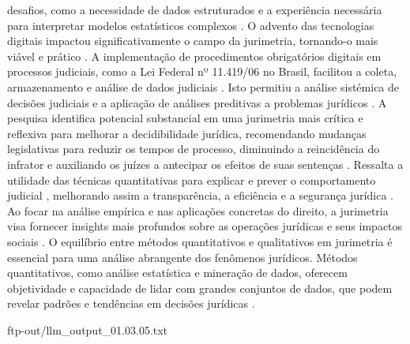 desafios, como a necessidade de dados estruturados e a experiência necessária para interpretar modelos estatísticos complexos \cite{103390fi9040068, l2010de}. O advento das tecnologias digitais impactou significativamente o campo da jurimetria, tornando-o mais viável e prático \cite{silva2023role, 103390fi9040068}. A implementação de procedimentos obrigatórios digitais em processos judiciais, como a Lei Federal nº 11.419/06 no Brasil, facilitou a coleta, armazenamento e análise de dados judiciais \cite{103390fi9040068}. Isto permitiu a análise sistémica de decisões judiciais e a aplicação de análises preditivas a problemas jurídicos \cite{silva2023role, 103390fi9040068}. A pesquisa identifica potencial substancial em uma jurimetria mais crítica e reflexiva para melhorar a decidibilidade jurídica, recomendando mudanças legislativas para reduzir os tempos de processo, diminuindo a reincidência do infrator e auxiliando os juízes a antecipar os efeitos de suas sentenças \cite{nunes2018}. Ressalta a utilidade das técnicas quantitativas para explicar e prever o comportamento judicial \cite{luvizotto2020}, melhorando assim a transparência, a eficiência e a segurança jurídica \cite{silva2023}. Ao focar na análise empírica e nas aplicações concretas do direito, a jurimetria visa fornecer insights mais profundos sobre as operações jurídicas e seus impactos sociais \cite{nunes2018}. O equilíbrio entre métodos quantitativos e qualitativos em jurimetria é essencial para uma análise abrangente dos fenômenos jurídicos. Métodos quantitativos, como análise estatística e mineração de dados, oferecem objetividade e capacidade de lidar com grandes conjuntos de dados, que podem revelar padrões e tendências em decisões jurídicas \cite{10.1177/0094306118767649,de2010jurimetrics}. 

ftp-out/llm_output_01.03.05.txt 

